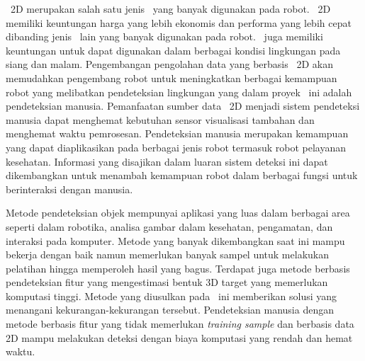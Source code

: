 \lidar\ 2D merupakan salah satu jenis \lidar\ yang banyak digunakan pada robot. \lidar\ 2D memiliki keuntungan harga yang lebih ekonomis dan performa yang lebih cepat dibanding jenis \lidar\ lain yang banyak digunakan pada robot. \lidar\ juga memiliki keuntungan untuk dapat digunakan dalam berbagai kondisi lingkungan pada siang dan malam.
Pengembangan pengolahan data yang berbasis \lidar\ 2D akan memudahkan pengembang robot untuk meningkatkan berbagai kemampuan robot yang melibatkan pendeteksian lingkungan yang dalam proyek \capstone\ ini adalah pendeteksian manusia. Pemanfaatan sumber data \lidar\ 2D menjadi sistem pendeteksi manusia dapat menghemat kebutuhan sensor visualisasi tambahan dan menghemat waktu pemrosesan. Pendeteksian manusia merupakan kemampuan yang dapat diaplikasikan pada berbagai jenis robot termasuk robot pelayanan kesehatan. Informasi yang disajikan dalam luaran sistem deteksi ini dapat dikembangkan untuk menambah kemampuan robot dalam berbagai fungsi untuk berinteraksi dengan manusia. 

Metode pendeteksian objek mempunyai aplikasi yang luas dalam berbagai area seperti dalam robotika, analisa gambar dalam kesehatan, pengamatan, dan interaksi pada komputer. Metode yang banyak dikembangkan saat ini mampu bekerja dengan baik namun memerlukan banyak sampel untuk melakukan pelatihan hingga memperoleh hasil yang bagus. Terdapat juga metode berbasis pendeteksian fitur yang mengestimasi bentuk 3D target yang memerlukan komputasi tinggi. Metode yang diusulkan pada \capstone\ ini memberikan solusi yang menangani kekurangan-kekurangan tersebut. Pendeteksian manusia dengan metode berbasis fitur yang tidak memerlukan \textit{training sample} dan berbasis data 2D mampu melakukan deteksi dengan biaya komputasi yang rendah dan hemat waktu.






















